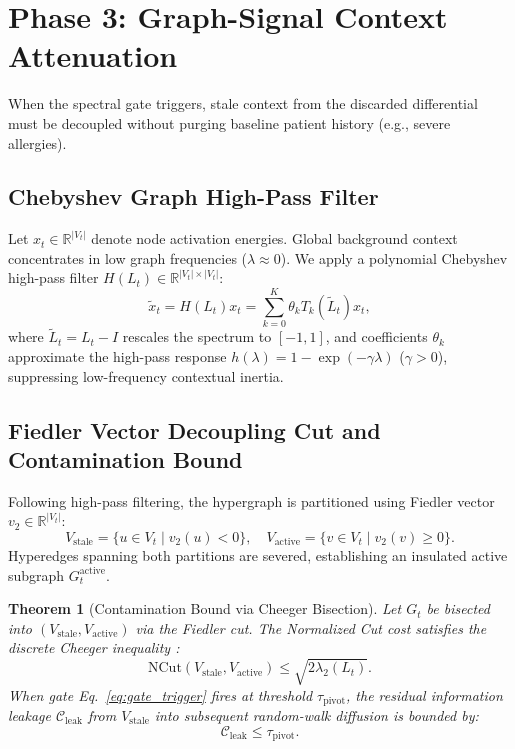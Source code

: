 \documentclass[10pt, onecolumn]{article}
\newtheorem{theorem}{Theorem}[section]
\newcommand{\R}{\mathbb{R}}
\begin{document}
\section{Phase 3: Graph-Signal Context Attenuation}
\label{sec:phase3}

When the spectral gate triggers, stale context from the discarded differential must be decoupled without purging baseline patient history (e.g., severe allergies).

\subsection{Chebyshev Graph High-Pass Filter}
Let $x_t \in \R^{|V_t|}$ denote node activation energies. Global background context concentrates in low graph frequencies ($\lambda \approx 0$). We apply a polynomial Chebyshev high-pass filter $H(L_t) \in \R^{|V_t| \times |V_t|}$:
\begin{equation}
  \tilde{x}_t = H(L_t) x_t = \sum_{k=0}^{K} \theta_k T_k(\tilde{L}_t) x_t,
  \label{eq:chebyshev_filter}
\end{equation}
where $\tilde{L}_t = L_t - I$ rescales the spectrum to $[-1, 1]$, and coefficients $\theta_k$ approximate the high-pass response $h(\lambda) = 1 - \exp(-\gamma \lambda)$ ($\gamma > 0$), suppressing low-frequency contextual inertia.

\subsection{Fiedler Vector Decoupling Cut and Contamination Bound}
Following high-pass filtering, the hypergraph is partitioned using Fiedler vector $v_2 \in \R^{|V_t|}$:
\begin{equation}
  V_{\text{stale}} = \{u \in V_t \mid v_2(u) < 0\}, \quad V_{\text{active}} = \{v \in V_t \mid v_2(v) \ge 0\}.
  \label{eq:fiedler_cut}
\end{equation}
Hyperedges spanning both partitions are severed, establishing an insulated active subgraph $G_t^{\text{active}}$.

\begin{theorem}[Contamination Bound via Cheeger Bisection]
\label{thm:cheeger_bound}
Let $G_t$ be bisected into $(V_{\text{stale}}, V_{\text{active}})$ via the Fiedler cut. The Normalized Cut cost satisfies the discrete Cheeger inequality \cite{chung1997spectral}:
\begin{equation}
  \mathrm{NCut}(V_{\text{stale}}, V_{\text{active}}) \le \sqrt{2 \lambda_2(L_t)}.
  \label{eq:cheeger_ineq}
\end{equation}
When gate Eq.~\eqref{eq:gate_trigger} fires at threshold $\tau_{\text{pivot}}$, the residual information leakage $\mathcal{C}_{\text{leak}}$ from $V_{\text{stale}}$ into subsequent random-walk diffusion is bounded by:
\begin{equation}
  \mathcal{C}_{\text{leak}} \le \tau_{\text{pivot}}.
  \label{eq:leakage_bound}
\end{equation}
\end{theorem}
\end{document}
